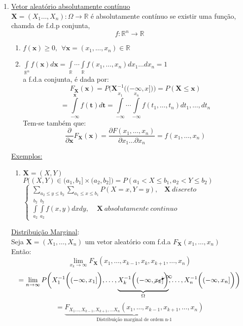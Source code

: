 \documentclass[a4paper,12pt]{article}
\begin{document}
\begin{enumerate}
\begin{enumerate}[label=\roman*)]
	\end{enumerate}

\item \underline{Vetor aleatório absolutamente contínuo}\\
$\bm X=(X_1\ldots,X_n):\Omega \longrightarrow \mathbb R$ é absolutamente contínuo se existir uma função, chamda de f.d.p conjunta,
$$f:\mathbb R^n \longrightarrow \mathbb R $$
\begin{enumerate}[label=\roman*)]
	\item $f(\bm x)\ge 0, \ \ \forall \bm x=(x_1,\ldots,x_n)\in \mathbb R$
	\item $\int\limits_{\mathbb R^n} f(\bm x)d\bm x=\int\limits_{\mathbb R}\cdots \int\limits_{\mathbb R}f(x_1,\ldots,x_n)dx_1\ldots dx_n = 1$\\
	a f.d.a conjunta, é dada por:
	$$F_{\bm X}(\bm x) = P\bigg(\bm X^{-1}\bigg((-\infty,x]\bigg)\bigg)=P(\bm X\le \bm x) $$
	$$= \int\limits_{-\infty}^{\bm x}f(\bm t)d\bm t = \int\limits_{-\infty}^{x_1}\cdots \int\limits_{-\infty}^{x_n}f(t_1,\ldots,t_n)dt_1,\ldots,dt_n $$
	Tem-se também que:\\
	$$\frac{\partial}{\partial \bm x}F_{\bm X}(\bm x)= \frac{\partial F(x_1,\ldots,x_n)}{\partial x_1\ldots \partial x_n } =f(x_1,\ldots,x_n)  $$
\end{enumerate}
\underline{Exemplos:}
\begin{enumerate}
	\item $\bm X=(X,Y)$\\
	$P\bigg((X,Y)\in (a_1,b_1]\times(a_2,b_2] \bigg)= P(a_1< X\le b_1,a_2< Y\le b_2)$ \\
	$\begin{cases}
		\sum\limits_{a_2\le y \le b_2}\sum\limits_{a_1\le x \le b_1}P(X=x,Y=y), \ \ \ \ \bm X \ discreto\\
\int\limits_{a_2}^{b_2}\int\limits_{a_2}^{b_2}f(x,y)dxdy, \ \ \ \ \ \bm X \ absolutamente \ continuo
	\end{cases}$
\end{enumerate}
\underline{Distribuição Marginal}:\\
Seja $\bm X=(X_1,\ldots,X_n )$ um vetor aleatório com f.d.a $F_{\bm X}(x_1,\ldots,x_n)$\\
Então:
$$\lim\limits_{x_k\rightarrow \infty}F_{\bm X}(x_1,\ldots,x_{k-1},x_k,x_{k+1},\ldots,x_n)$$
$$ =
\lim\limits_{n\rightarrow \infty} P\bigg(
X_1^{-1}\bigg((-\infty,x_1]\bigg),\ldots, \underbrace{X_k^{-1}\bigg((-\infty,\cancelto{\infty}{x_k}]\bigg)}_{\Omega},\ldots, X_n^{-1}\bigg((-\infty,x_n]\bigg)
\bigg)$$
$$= \underbrace{F_{X_1\ldots,X_{k-1},X_{k+1},\ldots X_n}(x_1,\ldots,x_{k-1},x_{k+1},\ldots,x_n)}_{\text{Distribuição marginal de ordem n-1}} $$ 

\end{enumerate}
\end{document}
